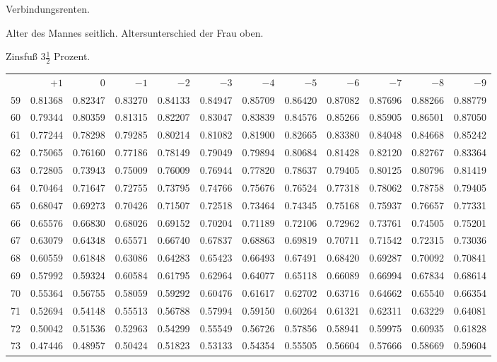 \clearpage
{}
\begin{center}
Verbindungsrenten.\par\smallskip
Alter des Mannes seitlich. Altersunterschied der Frau oben.\par\smallskip
Zinsfuß \(3\tfrac{1}{2}\) Prozent.\par\medskip
\fontsize{8}{10}\selectfont\setlength{\tabcolsep}{1.3pt}
\begin{tabular}{|r|rrrrrrrrrrr|}
\hline
&\(+1\)&0&\(-1\)&\(-2\)&\(-3\)&\(-4\)&\(-5\)&\(-6\)&\(-7\)&\(-8\)&\(-9\)\\[8pt]
59&0.81368&0.82347&0.83270&0.84133&0.84947&0.85709&0.86420&0.87082&0.87696&0.88266&0.88779\\
60&0.79344&0.80359&0.81315&0.82207&0.83047&0.83839&0.84576&0.85266&0.85905&0.86501&0.87050\\
61&0.77244&0.78298&0.79285&0.80214&0.81082&0.81900&0.82665&0.83380&0.84048&0.84668&0.85242\\
62&0.75065&0.76160&0.77186&0.78149&0.79049&0.79894&0.80684&0.81428&0.82120&0.82767&0.83364\\
63&0.72805&0.73943&0.75009&0.76009&0.76944&0.77820&0.78637&0.79405&0.80125&0.80796&0.81419\\
64&0.70464&0.71647&0.72755&0.73795&0.74766&0.75676&0.76524&0.77318&0.78062&0.78758&0.79405\\[5pt]
65&0.68047&0.69273&0.70426&0.71507&0.72518&0.73464&0.74345&0.75168&0.75937&0.76657&0.77331\\
66&0.65576&0.66830&0.68026&0.69152&0.70204&0.71189&0.72106&0.72962&0.73761&0.74505&0.75201\\
67&0.63079&0.64348&0.65571&0.66740&0.67837&0.68863&0.69819&0.70711&0.71542&0.72315&0.73036\\
68&0.60559&0.61848&0.63086&0.64283&0.65423&0.66493&0.67491&0.68420&0.69287&0.70092&0.70841\\
69&0.57992&0.59324&0.60584&0.61795&0.62964&0.64077&0.65118&0.66089&0.66994&0.67834&0.68614\\[5pt]
70&0.55364&0.56755&0.58059&0.59292&0.60476&0.61617&0.62702&0.63716&0.64662&0.65540&0.66354\\
71&0.52694&0.54148&0.55513&0.56788&0.57994&0.59150&0.60264&0.61321&0.62311&0.63229&0.64081\\
72&0.50042&0.51536&0.52963&0.54299&0.55549&0.56726&0.57856&0.58941&0.59975&0.60935&0.61828\\
73&0.47446&0.48957&0.50424&0.51823&0.53133&0.54354&0.55505&0.56604&0.57666&0.58669&0.59604\\

\end{tabular}
\end{center}
